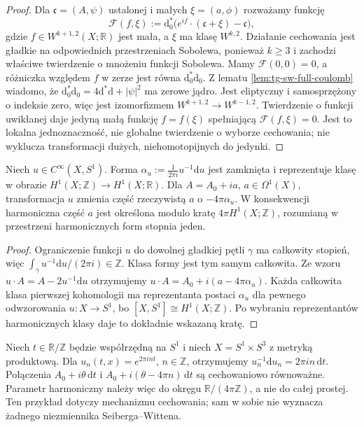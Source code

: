 \begin{proof}
Dla $\mathfrak c=(A,\psi)$ ustalonej i małych
$\xi=(a,\phi)$ rozważamy funkcję
\[
\mathcal F(f,\xi):=\mathrm d_0^*
\bigl(e^{if}\cdot(\mathfrak c+\xi)-\mathfrak c\bigr),
\]
gdzie $f\in W^{k+1,2}(X;\mathbb R)$ jest mała, a $\xi$
ma klasę $W^{k,2}$. Działanie cechowania jest gładkie
na odpowiednich przestrzeniach Sobolewa, ponieważ $k\ge3$
i zachodzi właściwe twierdzenie o mnożeniu funkcji Sobolewa.
Mamy $\mathcal F(0,0)=0$, a różniczka względem $f$
w zerze jest równa $\mathrm d_0^*\mathrm d_0$.
Z lematu \ref{lem:tg-sw-full-coulomb} wiadomo, że
$\mathrm d_0^*\mathrm d_0=4\mathrm d^*\mathrm d+|\psi|^2$
ma zerowe jądro. Jest eliptyczny i samosprzężony o indeksie
zero, więc jest izomorfizmem
$W^{k+1,2}\to W^{k-1,2}$.
Twierdzenie o funkcji uwikłanej daje jedyną małą funkcję
$f=f(\xi)$ spełniającą $\mathcal F(f,\xi)=0$.
Jest to lokalna jednoznaczność, nie globalne twierdzenie
o wyborze cechowania; nie wyklucza transformacji dużych,
niehomotopijnych do jedynki.
\end{proof}

\begin{stwierdzenie}
\label{prop:tg-sw12-lattice}
Niech $u\in C^\infty(X,S^1)$. Forma
$\alpha_u:=\frac{1}{2\pi i}u^{-1}\mathrm du$ jest zamknięta
i reprezentuje klasę w obrazie
$H^1(X;\mathbb Z)\to H^1(X;\mathbb R)$.
Dla $A=A_0+i a$, $a\in\Omega^1(X)$, transformacja $u$
zmienia część rzeczywistą $a$ o $-4\pi\alpha_u$.
W konsekwencji harmoniczna część $a$ jest określona
modulo kratę $4\pi H^1(X;\mathbb Z)$, rozumianą
w przestrzeni harmonicznych form stopnia jeden.
\end{stwierdzenie}

\begin{proof}
Ograniczenie funkcji $u$ do dowolnej gładkiej pętli
$\gamma$ ma całkowity stopień, więc
$\int_\gamma u^{-1}\mathrm du/(2\pi i)\in\mathbb Z$.
Klasa formy jest tym samym całkowita. Ze wzoru
$u\cdot A=A-2u^{-1}\mathrm du$ otrzymujemy
$u\cdot A=A_0+i(a-4\pi\alpha_u)$.
Każda całkowita klasa pierwszej kohomologii ma reprezentanta
postaci $\alpha_u$ dla pewnego odwzorowania $u:X\to S^1$,
bo $[X,S^1]\cong H^1(X;\mathbb Z)$. Po wybraniu
reprezentantów harmonicznych klasy daje to dokładnie
wskazaną kratę.
\end{proof}

\begin{przyklad}
Niech $t\in\mathbb R/\mathbb Z$ będzie współrzędną na
$S^1$ i niech $X=S^1\times S^3$ z metryką produktową.
Dla $u_n(t,x)=e^{2\pi int}$, $n\in\mathbb Z$,
otrzymujemy $u_n^{-1}\mathrm du_n=2\pi in\,\mathrm dt$.
Połączenia $A_0+i\theta\,\mathrm dt$ i
$A_0+i(\theta-4\pi n)\,\mathrm dt$ są cechowaniowo
równoważne. Parametr harmoniczny należy więc do okręgu
$\mathbb R/(4\pi\mathbb Z)$, a nie do całej prostej.
Ten przykład dotyczy mechanizmu cechowania; sam w sobie
nie wyznacza żadnego niezmiennika Seiberga--Wittena.
\end{przyklad}


